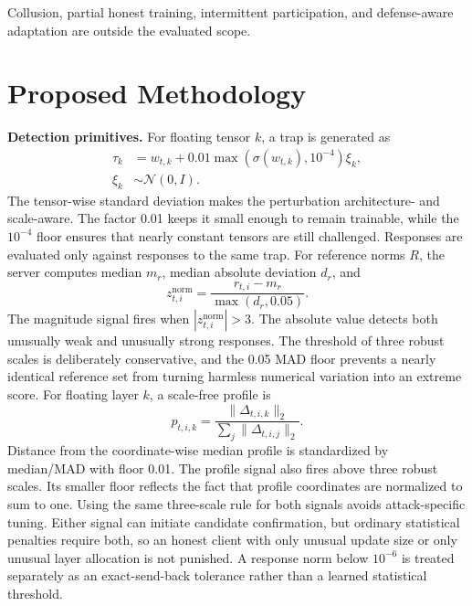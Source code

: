 \documentclass[conference]{IEEEtran}
\begin{document}
Collusion, partial honest training, intermittent participation, and defense-aware adaptation are outside the evaluated scope.

\section{Proposed Methodology}
\noindent\textbf{Detection primitives.}
For floating tensor $k$, a trap is generated as
\begin{equation}
\begin{aligned}
\tau_k &= w_{t,k}+0.01\max(\sigma(w_{t,k}),10^{-4})\xi_k,\\
\xi_k &\sim \mathcal N(0,I).
\end{aligned}
\end{equation}
The tensor-wise standard deviation makes the perturbation architecture- and scale-aware. The factor 0.01 keeps it small enough to remain trainable, while the $10^{-4}$ floor ensures that nearly constant tensors are still challenged. Responses are evaluated only against responses to the same trap. For reference norms $R$, the server computes median $m_r$, median absolute deviation $d_r$, and
\begin{equation}
z^{\mathrm{norm}}_{t,i}=\frac{r_{t,i}-m_r}{\max(d_r,0.05)}.
\end{equation}
The magnitude signal fires when $|z^{\mathrm{norm}}_{t,i}|>3$. The absolute value detects both unusually weak and unusually strong responses. The threshold of three robust scales is deliberately conservative, and the 0.05 MAD floor prevents a nearly identical reference set from turning harmless numerical variation into an extreme score. For floating layer $k$, a scale-free profile is
\begin{equation}
p_{t,i,k}=\frac{\lVert\Delta_{t,i,k}\rVert_2}
{\sum_j\lVert\Delta_{t,i,j}\rVert_2}.
\end{equation}
Distance from the coordinate-wise median profile is standardized by median/MAD with floor 0.01. The profile signal also fires above three robust scales. Its smaller floor reflects the fact that profile coordinates are normalized to sum to one. Using the same three-scale rule for both signals avoids attack-specific tuning. Either signal can initiate candidate confirmation, but ordinary statistical penalties require both, so an honest client with only unusual update size or only unusual layer allocation is not punished. A response norm below $10^{-6}$ is treated separately as an exact-send-back tolerance rather than a learned statistical threshold.
\end{document}
